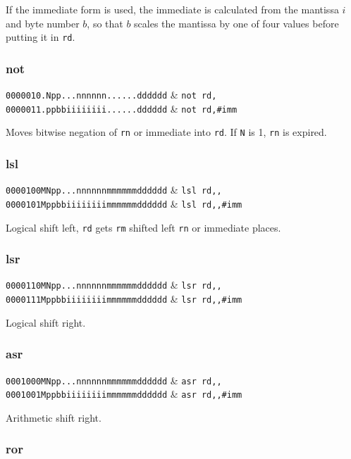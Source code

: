 If the immediate form is used, the immediate is calculated from the mantissa $i$ and byte number $b$, so that $b$ scales the mantissa by one of four values before putting it in \texttt{rd}.

\subsubsection{not}

\decfmt
\texttt{0000010.Npp...nnnnnn......dddddd} & \texttt{not rd,}\\
\texttt{0000011.ppbbiiiiiiii......dddddd} & \texttt{not rd,\#imm}
\finfmt

Moves bitwise negation of \texttt{rn} or immediate into \texttt{rd}. If \texttt{N} is 1, \texttt{rn} is expired.

\subsubsection{lsl}

\decfmt
\texttt{0000100MNpp...nnnnnnmmmmmmdddddd} & \texttt{lsl rd,,} \\
\texttt{0000101Mppbbiiiiiiiimmmmmmdddddd} & \texttt{lsl rd,,\#imm}
\finfmt

Logical shift left, \texttt{rd} gets \texttt{rm} shifted left \texttt{rn} or immediate places.

\subsubsection{lsr}

\decfmt
\texttt{0000110MNpp...nnnnnnmmmmmmdddddd} & \texttt{lsr rd,,}\\
\texttt{0000111Mppbbiiiiiiiimmmmmmdddddd} & \texttt{lsr rd,,\#imm}
\finfmt

Logical shift right.

\subsubsection{asr}

\decfmt
\texttt{0001000MNpp...nnnnnnmmmmmmdddddd} & \texttt{asr rd,,}\\
\texttt{0001001Mppbbiiiiiiiimmmmmmdddddd} & \texttt{asr rd,,\#imm}
\finfmt

Arithmetic shift right.

\subsubsection{ror}

